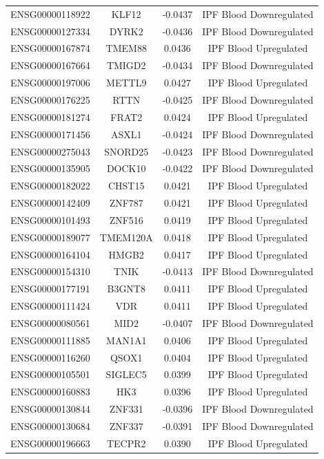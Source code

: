 \documentclass[
]{article}
\begin{document}
\begin{singlespace}
\begin{longtable}[t]{lccc}
ENSG00000118922 & KLF12 & -0.0437 & IPF Blood Downregulated\\
\addlinespace
ENSG00000127334 & DYRK2 & -0.0436 & IPF Blood Downregulated\\
ENSG00000167874 & TMEM88 & 0.0436 & IPF Blood Upregulated\\
ENSG00000167664 & TMIGD2 & -0.0434 & IPF Blood Downregulated\\
ENSG00000197006 & METTL9 & 0.0427 & IPF Blood Upregulated\\
ENSG00000176225 & RTTN & -0.0425 & IPF Blood Downregulated\\
\addlinespace
ENSG00000181274 & FRAT2 & 0.0424 & IPF Blood Upregulated\\
ENSG00000171456 & ASXL1 & -0.0424 & IPF Blood Downregulated\\
ENSG00000275043 & SNORD25 & -0.0423 & IPF Blood Downregulated\\
ENSG00000135905 & DOCK10 & -0.0422 & IPF Blood Downregulated\\
ENSG00000182022 & CHST15 & 0.0421 & IPF Blood Upregulated\\
\addlinespace
ENSG00000142409 & ZNF787 & 0.0421 & IPF Blood Upregulated\\
ENSG00000101493 & ZNF516 & 0.0419 & IPF Blood Upregulated\\
ENSG00000189077 & TMEM120A & 0.0418 & IPF Blood Upregulated\\
ENSG00000164104 & HMGB2 & 0.0417 & IPF Blood Upregulated\\
ENSG00000154310 & TNIK & -0.0413 & IPF Blood Downregulated\\
\addlinespace
ENSG00000177191 & B3GNT8 & 0.0411 & IPF Blood Upregulated\\
ENSG00000111424 & VDR & 0.0411 & IPF Blood Upregulated\\
ENSG00000080561 & MID2 & -0.0407 & IPF Blood Downregulated\\
ENSG00000111885 & MAN1A1 & 0.0406 & IPF Blood Upregulated\\
ENSG00000116260 & QSOX1 & 0.0404 & IPF Blood Upregulated\\
\addlinespace
ENSG00000105501 & SIGLEC5 & 0.0399 & IPF Blood Upregulated\\
ENSG00000160883 & HK3 & 0.0396 & IPF Blood Upregulated\\
ENSG00000130844 & ZNF331 & -0.0396 & IPF Blood Downregulated\\
ENSG00000130684 & ZNF337 & -0.0391 & IPF Blood Downregulated\\
ENSG00000196663 & TECPR2 & 0.0390 & IPF Blood Upregulated\\

\end{longtable}
\end{singlespace}
\end{document}

